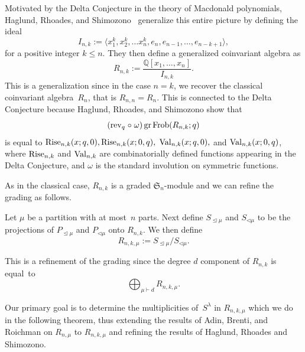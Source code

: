 \documentclass[10pt]{article}
\newcommand{\coloneqq}{:=}
\newcommand{\Frob}{\operatorname{Frob}}\newcommand{\gr}{\operatorname{gr}}
\begin{document}
	Motivated by the Delta Conjecture in the theory of Macdonald polynomials, Haglund, Rhoades, and Shimozono~\cite{HRS} 
generalize this entire picture by defining the ideal 
\begin{equation}
I_{n,k}\coloneqq \langle x_1^k,x_2^k,\ldots x_n^k, e_{n},e_{n-1},\ldots, e_{n-k+1}\rangle,
\end{equation}
for a positive integer $k\leq n$. They then define a generalized coinvariant algebra as 
\begin{equation}
R_{n,k}\coloneqq \frac{\mathbb{Q}[x_1,\ldots, x_n]}{I_{n,k}}.
\end{equation}
 This is a generalization since in the case $n=k$, we recover the classical coinvariant algebra~$R_n$, that is 
$R_{n,n}=R_n$. This is connected to the Delta Conjecture because Haglund, Rhoades, and Shimozono show that 
\begin{equation}
(\rev_q\mathrel{\circ} \omega)\gr\Frob (R_{n,k};q)
\end{equation} 
is equal to $\operatorname{Rise} _{n,k}(x;q,0),\operatorname{Rise} _{n,k}(x;0,q),$ 
$\operatorname{Val} _{n,k}(x;q,0),$ and $\operatorname{Val} _{n,k}(x;0,q)$, where $\operatorname{Rise} _{n,k}$ and $\operatorname{Val} _{n,k}$ are 
combinatorially defined functions appearing in the Delta Conjecture, and $\omega$ is the standard involution on symmetric 
functions.

	As in the classical case, $R_{n,k}$ is a graded $\mathfrak{S}_n$-module and we can refine the grading as follows.

	\begin{defi}
	Let $\mu$ be a partition with at most~$n$ parts. Next define $S_{\trianglelefteq\mu}$ and $S_{\triangleleft\mu}$ to be 
the projections of $P_{\trianglelefteq\mu}$ and $P_{\triangleleft\mu}$ onto $R_{n,k}$. We then define 
		\begin{equation}
R_{n,k,\mu}\coloneqq S_{\trianglelefteq\mu}/S_{\triangleleft\mu}.
\end{equation}
	\end{defi}
	This is a refinement of the grading since the degree $d$ component of $R_{n,k}$ is equal~to 
\begin{equation}
\bigoplus_{\mu\vdash d} R_{n,k,\mu}.
\end{equation}


Our primary goal is to determine the multiplicities of~$S^\lambda$ in $R_{n,k,\mu}$ which we do in the following theorem, thus 
extending the results of Adin, Brenti, and Roichman on $R_{n,\mu}$ to $R_{n,k,\mu}$ and refining the results of Haglund, 
Rhoades and Shimozono.
\end{document}
